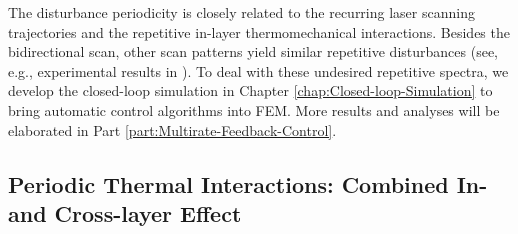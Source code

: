 \documentclass [11pt, proquest] {uwthesis}[2020/02/24]
\begin{document}
The disturbance periodicity is closely related to the recurring laser
scanning trajectories and the repetitive in-layer thermomechanical
interactions. Besides the bidirectional scan, other scan patterns
yield similar repetitive disturbances (see, e.g., experimental results
in \cite{dunbar2017comparisons}). To deal with these undesired repetitive
spectra, we develop the closed-loop simulation in Chapter \ref{chap:Closed-loop-Simulation}
to bring automatic control algorithms \cite{chen2014new,wang2018multirate}
into FEM. More results and analyses will be elaborated in Part
\ref{part:Multirate-Feedback-Control}.

\subsection{Periodic Thermal Interactions: Combined In- and Cross-layer Effect} \label{subsec:In-and Cross-layer-Effects}
\end{document}

